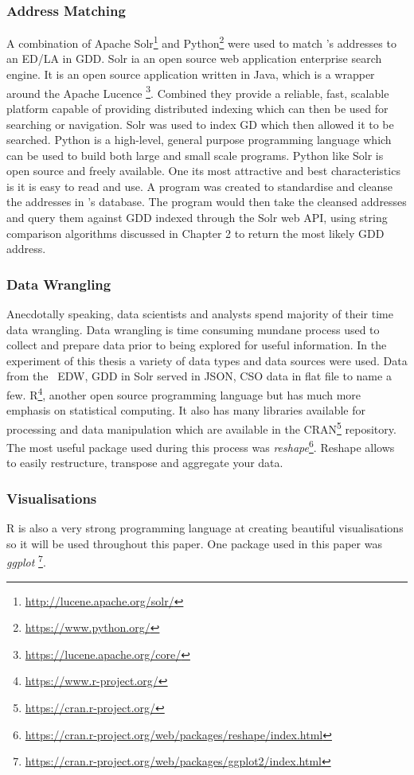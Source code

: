 \subsubsection{Address Matching}
A combination of Apache Solr\footnote{\url{http://lucene.apache.org/solr/}} and Python\footnote{\url{https://www.python.org/}} were used to match \subjectname's addresses to an ED/LA in GDD. Solr ia an open source web application enterprise search engine. It is an open source application written in Java, which is a wrapper around the Apache Lucence \footnote{{\url{https://lucene.apache.org/core/}}}. Combined they provide a reliable, fast, scalable platform capable of providing distributed indexing which can then be used for searching or navigation. Solr was used to index GD which then allowed it to be searched. Python is a high-level, general purpose programming language which can be used to build both large and small scale programs. Python like Solr is open source and freely available. One its most attractive and best characteristics is it is easy to read and use. A program was created to standardise and cleanse the addresses in \subjectname's database. The program would then take the cleansed addresses and query them against GDD indexed through the Solr web API, using string comparison algorithms discussed in Chapter 2 to return the most likely GDD address.

\subsubsection{Data Wrangling}
Anecdotally speaking, data scientists and analysts spend majority of their time data wrangling. Data wrangling is time consuming mundane process used to collect and prepare data prior to being explored for useful information. In the experiment of this thesis a variety of data types and data sources were used. Data from the \subjectname\ EDW, GDD in Solr served in JSON, CSO data in flat file to name a few. R\footnote{{\url{https://www.r-project.org/}}}, another open source programming language but has much more emphasis on statistical computing. It also has many libraries available for processing and data manipulation which are available in the CRAN\footnote{{\url{https://cran.r-project.org/}}} repository. The most useful package used during this process was \textit{reshape}\footnote{{\url{https://cran.r-project.org/web/packages/reshape/index.html}}}. Reshape allows to easily restructure, transpose and aggregate your data. 

\subsubsection{Visualisations}
R is also a very strong programming language at creating beautiful visualisations so it will be used throughout this paper. One package used in this paper was \textit{ggplot}
\footnote{{\url{https://cran.r-project.org/web/packages/ggplot2/index.html}}}. 


